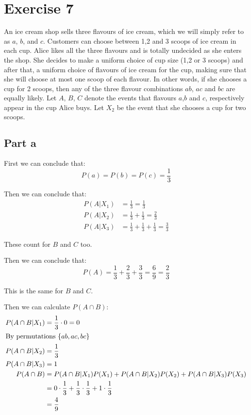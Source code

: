 \section{Exercise 7}
An ice cream shop sells three flavours of ice cream, which we will simply refer to as $a$, $b$, and $c$. Customers can choose between 1,2 and 3 scoops of ice cream in each cup. Alice likes all the three flavours and is totally undecided as she enters the shop. She decides to make a uniform choice of cup size (1,2 or 3 scoops) and after that, a uniform choice of flavours of ice cream for the cup, making sure that she will choose at most one scoop of each flavour. In other words, if she chooses a cup for 2 scoops, then any of the three flavour combinations $ab$, $ac$ and $bc$ are equally likely. Let $A$, $B$, $C$ denote the events that flavours $a$,$b$ and $c$, respectively appear in the cup Alice buys. Let $X_2$ be the event that she chooses a cup for two scoops.

\subsection{Part a}

First we can conclude that:
\[
	P(a) = P(b) = P(c) = \frac{1}{3}
\]

Then we can conclude that:
\begin{align*}
	P(A|X_1) & = \frac{1}{3} = \frac{1}{3}                             \\
	P(A|X_2) & = \frac{1}{3} + \frac{1}{3} = \frac{2}{3}               \\
	P(A|X_3) & = \frac{1}{3} + \frac{1}{3} + \frac{1}{3} = \frac{3}{3}
\end{align*}

These count for $B$ and $C$ too.

Then we can conclude that:
\[
	P(A) = \frac{1}{3}+\frac{2}{3} + \frac{3}{3} = \frac{6}{9} = \frac{2}{3}
\]

This is the same for $B$ and $C$.

Then we can calculate $P(A \cap B)$:
\begin{align*}
	P(A\cap B|X_1) & = \frac{1}{3} \cdot 0 = 0                                                  \\
	\intertext{By permutations $\{ab, ac, bc\}$}
	P(A\cap B|X_2) & = \frac{1}{3}                                                              \\
	P(A\cap B|X_3) & = 1                                                                        \\
	P(A \cap B)    & = P(A\cap B|X_1)P(X_1) + P(A\cap B|X_2)P(X_2) + P(A\cap B|X_3)P(X_3)       \\
	               & = 0\cdot \frac{1}{3} + \frac{1}{3} \cdot \frac{1}{3} + 1 \cdot \frac{1}{3} \\
	               & = \frac{4}{9}
\end{align*}

